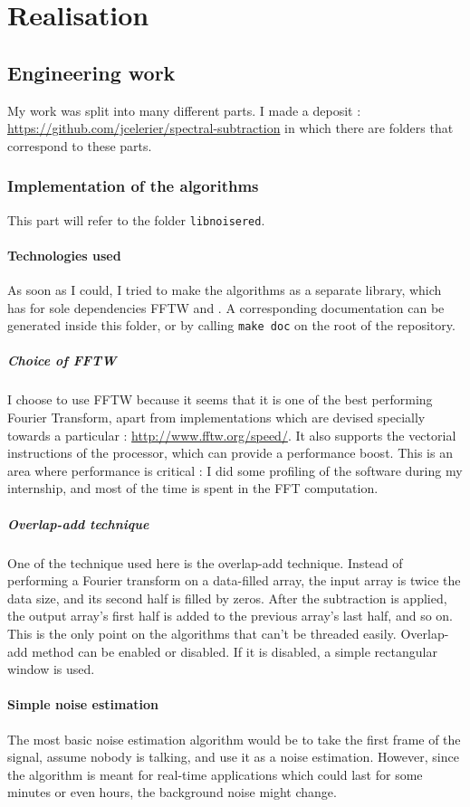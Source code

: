 \section{Realisation}
\subsection{Engineering work}
My work was split into many different parts. I made a  deposit : \url{https://github.com/jcelerier/spectral-subtraction} in which there are folders that correspond to these parts.
\subsubsection{Implementation of the algorithms}
This part will refer to the folder \texttt{libnoisered}. 

\paragraph{Technologies used}
As soon as I could, I tried to make the algorithms as a separate library, which has for sole dependencies \ac{FFTW} and . A corresponding  documentation can be generated inside this folder, or by calling \texttt{make doc} on the root of the repository.

\subparagraph{Choice of \ac{FFTW}} I choose to use \ac{FFTW} because it seems that it is one of the best performing Fourier Transform, apart from implementations which are devised specially towards a particular : \url{http://www.fftw.org/speed/}.
It also supports the  vectorial instructions of the  processor, which can provide a performance boost.
This is an area where performance is critical : I did some profiling of the software during my internship, and most of the time is spent in the \ac{FFT} computation.
\subparagraph{Overlap-add technique}
One of the technique used here is the overlap-add technique. Instead of performing a Fourier transform on a data-filled array, the input array is twice the data size, and its second half is filled by zeros.
After the subtraction is applied, the output array's first half is added to the previous array's last half, and so on. This is the only point on the algorithms that can't be threaded easily.
Overlap-add method can be enabled or disabled. If it is disabled, a simple rectangular window is used.

\paragraph{Simple noise estimation}
The most basic noise estimation algorithm would be to take the first frame of the signal, assume nobody is talking, and use it as a noise estimation.
However, since the algorithm is meant for real-time applications which could last for some minutes or even hours, the background noise might change.

